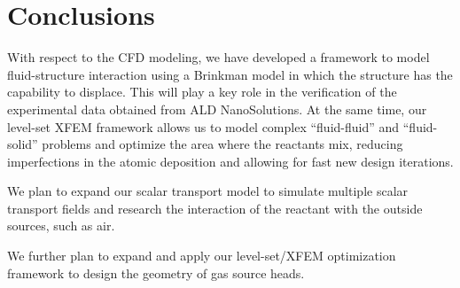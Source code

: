 % 
% 


\section{Conclusions}
\label{sec:ALD_conclusions}

With respect to the CFD modeling, we have developed a framework to model fluid-structure interaction using a Brinkman model in which the structure has the capability to displace. This will play a key role in the verification of the experimental data obtained from ALD NanoSolutions. At the same time, our level-set XFEM framework allows us to model complex ``fluid-fluid'' and ``fluid-solid'' problems and optimize the area where the reactants mix, reducing imperfections in the atomic deposition and allowing for fast new design iterations.

We plan to expand our scalar transport model to simulate multiple scalar transport fields and research the interaction of the reactant with the outside sources, such as air.

We further plan to expand and apply our level-set/XFEM optimization framework to design the geometry of gas source heads.


% 


% 
% 

% 
